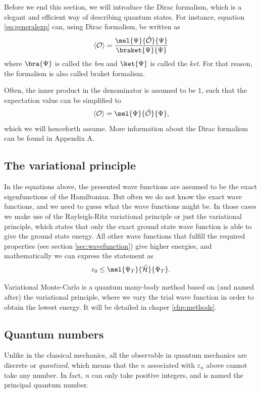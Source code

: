 Before we end this section, we will introduce the Dirac formalism, which is a elegant and efficient way of describing quantum states. For instance, equation \eqref{eq:generalexp} can, using Dirac formalism, be written as
\begin{equation}
\langle \mathcal{O}\rangle=\frac{\mel{\Psi}{\mathcal{\hat{O}}}{\Psi}}{\braket{\Psi}{\Psi}}
\end{equation}
where $\bra{\Psi}$ is called the \textit{bra} and $\ket{\Psi}$ is called the \textit{ket}. For that reason, the formalism is also called braket formalism. 

Often, the inner product in the denominator is assumed to be 1, such that the expectation value can be simplified to
\begin{equation}
\langle \mathcal{O}\rangle=\mel{\Psi}{\mathcal{\hat{O}}}{\Psi},
\end{equation}
which we will henceforth assume. More information about the Dirac formalism can be found in Appendix A. 

\subsection{The variational principle} \label{sec:variationalprinciple}
In the equations above, the presented wave functions are assumed to be the exact eigenfunctions of the Hamiltonian. But often we do not know the exact wave functions, and we need to guess what the wave functions might be. In those cases we make use of the Rayleigh-Ritz variational principle or just the variational principle, which states that only the exact ground state wave function is able to give the ground state energy. All other wave functions that fulfill the required properties (see section \ref{sec:wavefunction}) give higher energies, and mathematically we can express the statement as
\begin{equation}
\epsilon_0\leq\mel{\Psi_T}{\hat{\mathcal{H}}}{\Psi_T}.
\label{eq:variationalprinciple}
\end{equation}

Variational Monte-Carlo is a quantum many-body method based on (and named after) the variational principle, where we vary the trial wave function in order to obtain the lowest energy. It will be detailed in chaper \eqref{chp:methods}.

\subsection{Quantum numbers}
Unlike in the classical mechanics, all the observable in quantum mechanics are discrete or \textit{quantized}, which means that the $n$ associated with $\varepsilon_n$ above cannot take any number. In fact, $n$ can only take positive integers, and is named the principal quantum number.

